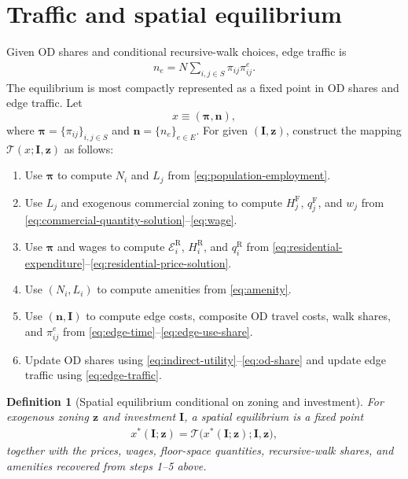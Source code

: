 \documentclass[12pt,a4paper]{article}
\newtheorem{definition}{Definition}
\newcommand{\R}{\mathrm{R}}
\newcommand{\F}{\mathrm{F}}
\newcommand{\1}{\mathbb 1}
\begin{document}
\section{Traffic and spatial equilibrium}

Given OD shares and conditional recursive-walk choices, edge traffic is
\begin{align}
n_e
=
N\sum_{i,j\in S}\pi_{ij}\pi_{ij}^{e}.
\label{eq:edge-traffic}
\end{align}
The equilibrium is most compactly represented as a fixed point in OD shares and edge traffic. Let
\[
x\equiv(\boldsymbol\pi,\mathbf n),
\]
where $\boldsymbol\pi=\{\pi_{ij}\}_{i,j\in S}$ and $\mathbf n=\{n_e\}_{e\in E}$. For given $(\mathbf I,\mathbf z)$, construct the mapping $\mathcal T(x;\mathbf I,\mathbf z)$ as follows:
\begin{enumerate}
\item Use $\boldsymbol\pi$ to compute $N_i$ and $L_j$ from \eqref{eq:population-employment}.
\item Use $L_j$ and exogenous commercial zoning to compute $H_j^{\F}$, $q_j^{\F}$, and $w_j$ from \eqref{eq:commercial-quantity-solution}--\eqref{eq:wage}.
\item Use $\boldsymbol\pi$ and wages to compute $\mathcal E_i^{\R}$, $H_i^{\R}$, and $q_i^{\R}$ from \eqref{eq:residential-expenditure}--\eqref{eq:residential-price-solution}.
\item Use $(N_i,L_i)$ to compute amenities from \eqref{eq:amenity}.
\item Use $(\mathbf n,\mathbf I)$ to compute edge costs, composite OD travel costs, walk shares, and $\pi_{ij}^e$ from \eqref{eq:edge-time}--\eqref{eq:edge-use-share}.
\item Update OD shares using \eqref{eq:indirect-utility}--\eqref{eq:od-share} and update edge traffic using \eqref{eq:edge-traffic}.
\end{enumerate}

\begin{definition}[Spatial equilibrium conditional on zoning and investment]
For exogenous zoning $\mathbf z$ and investment $\mathbf I$, a spatial equilibrium is a fixed point
\begin{align}
x^*(\mathbf I;\mathbf z)
=
\mathcal T\bigl(x^*(\mathbf I;\mathbf z);\mathbf I,\mathbf z\bigr),
\label{eq:spatial-fixed-point}
\end{align}
together with the prices, wages, floor-space quantities, recursive-walk shares, and amenities recovered from steps 1--5 above.
\end{definition}
\end{document}
